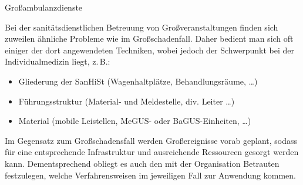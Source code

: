 \Text
{Großambulanzdienste}%
{%
Bei der sanitätsdienstlichen Betreuung von
Großveranstaltungen finden sich zuweilen ähnliche Probleme
wie im Großschadenfall. Daher bedient man sich oft einiger
der dort angewendeten Techniken, wobei jedoch der
Schwerpunkt bei der Individualmedizin liegt, z.\,B.:
\begin{itemize}
  \item Gliederung der SanHiSt (Wagenhaltplätze,
  Behandlungsräume, \ldots)
  \item Führungsstruktur (Material- und Meldestelle, div.
  Leiter \ldots)
  \item Material (mobile Leistellen, MeGUS- oder
  BaGUS-Einheiten, \ldots)
\end{itemize}
 
Im Gegensatz zum
Großschadensfall werden Großereignisse vorab geplant,
sodass für eine entsprechende Infrastruktur und
ausreichende Ressourcen gesorgt werden kann.
Dementsprechend obliegt es auch den mit der Organisation
 Betrauten festzulegen, welche Verfahrensweisen im
jeweiligen Fall zur Anwendung kommen.}%

\begin{Synopsis}
\end{Synopsis}


\begin{Literary}
\begin{description}
  \item[\cite{RkRahmenvorschriftGrossunfaelle2007}] 
  \item[\cite{RkPlsNeu2008}] 
\end{description}
\end{Literary}
 

\ChapterEnd
